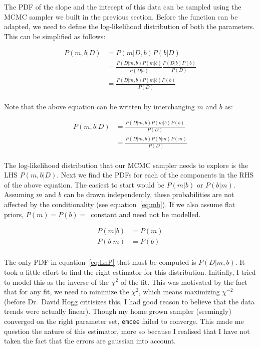 \documentclass[12pt,usletter,english]{article}
\begin{document}
The PDF of the slope and the intecept of this data can be sampled
using the MCMC sampler we built in the previous section. Before the
function can be adapted, we need to define the log-likelihood
distribution of both the parameters. This can be simplified as
follows:

\begin{equation}
  \begin{split}
    P(m,b|D) &= P(m|D,b)P(b|D)\\
    &= \frac{P(D|m,b)P(m|b)}{P(D|b)}\frac{P(D|b)P(b)}{P(D)}\\
    &= \frac{P(D|m,b)P(m|b)P(b)}{P(D)}\\
  \end{split}
\end{equation}

Note that the above equation can be written by interchanging $m$ and
$b$ as:

\begin{equation}
  \label{eq:LnP}
  \begin{split}
    P(m,b|D) &= \frac{P(D|m,b)P(m|b)P(b)}{P(D)}\\
    &= \frac{P(D|m,b)P(b|m)P(m)}{P(D)}\\
  \end{split}
\end{equation}

The log-likelihood distribution that our MCMC sampler needs to explore
is the LHS $P(m,b|D)$. Next we find the PDFs for each of the
components in the RHS of the above equation. The easiest to start
would be $P(m|b)$ or $P(b|m)$. Assuming $m$ and $b$ can be drawn
independently, these probabilities are not affected by the
conditionality (see equation~\ref{eq:mb}).  If we also assume flat
priors, $P(m)=P(b)=$~constant and need not be modelled.

\begin{equation}
  \label{eq:mb}
  \begin{split}
    P(m|b)&=P(m)\\
    P(b|m)&=P(b)\\
  \end{split}
\end{equation}

The only PDF in equation~\ref{eq:LnP} that must be computed is
$P(D|m,b)$. It took a little effort to find the right estimator for
this distribution. Initially, I tried to model this as the inverse of
the $\chi^2$ of the fit. This was motivated by the fact that for any
fit, we need to minimize the $\chi^2$, which means maximizing
$\chi^{-2}$ (before Dr.~David Hogg critisizes this, I had good reason
to believe that the data trends were actually linear). Though my home
grown sampler (seemingly) converged on the right parameter set,
\texttt{emcee} failed to converge. This made me question the nature of
this estimator, more so because I realised that I have not taken the
fact that the errors are gaussian into account.
\end{document}
